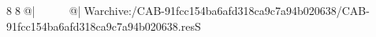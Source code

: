 8  8  @|                                                   @| W   archive:/CAB-91fcc154ba6afd318ca9c7a94b020638/CAB-91fcc154ba6afd318ca9c7a94b020638.resS 